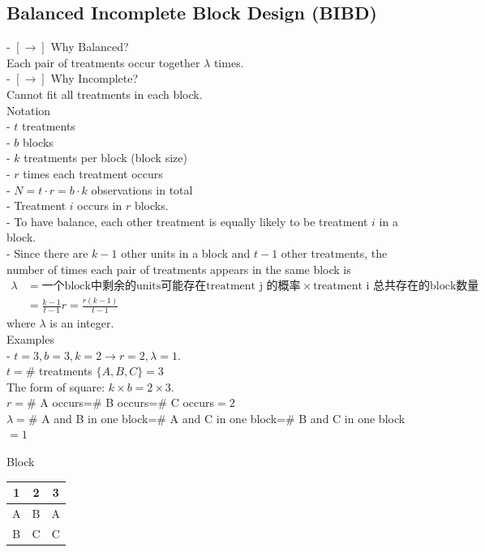 \documentclass[11pt,a4paper]{article}
\begin{document}
\subsection{ Balanced Incomplete Block Design (BIBD)}

- $[\rightarrow]$ Why Balanced?\\
Each pair of treatments occur together $\lambda$ times.\\
- $[\rightarrow]$ Why Incomplete?\\
Cannot fit all treatments in each block.\\

Notation\\
- $t$ treatments\\
- $b$ blocks\\
- $k$ treatments per block (block size)\\
- $r$ times each treatment occurs\\
- $N=t \cdot r=b \cdot k$ observations in total\\

- Treatment $i$ occurs in $r$ blocks.\\
- To have balance, each other treatment is equally likely to be treatment $i$ in a block.\\
- Since there are $k-1$ other units in a block and $t-1$ other treatments, the number of times each pair of treatments appears in the same block is
\begin{equation}
    \begin{aligned}
        \lambda&=\text{一个block中剩余的units可能存在treatment j 的概率}\times \text{treatment i 总共存在的block数量}\\&=\frac{k-1}{t-1}r=\frac{r(k-1)}{t-1}
    \end{aligned}
    \nonumber
\end{equation}
where $\lambda$ is an integer.\\

Examples\\
- $t=3, b=3, k=2 \rightarrow r=2, \lambda=1$.\\
$t=$\# treatments $\{A,B,C\}=3$\\
The form of square: $k\times b=2\times 3$.\\
$r=$\# A occurs=\# B occurs=\# C occurs$=2$\\
$\lambda=$\# A and B in one block=\# A and C in one block=\# B and C in one block$=1$
\begin{center}
    Block\\
\begin{tabular}{|c|c|c|}
\hline 1 & 2 & 3 \\
\hline A & B & A \\
\hline B & C & C \\
\hline
\end{tabular}
\end{center}
\end{document}
